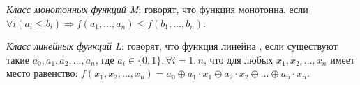 \textit{Класс монотонных функций M}: говорят, что функция монотонна, если $\forall i (a_{i} \leqslant b_{i}) \Rightarrow f(a_{1}, \ldots ,a_{n})\leqslant f(b_{1}, \ldots ,b_{n})$.

\textit{Класс линейных функций L}: говорят, что функция линейна , если существуют такие $a_{0}, a_{1}, a_{2}, \ldots, a_{n}$, где $a_{i} \in \{0, 1\}, \forall i=\overline{1,n}$, что для любых $x_{1}, x_{2}, \ldots, x_{n}$ имеет место равенство:
$f(x_{1}, x_{2}, \ldots, x_{n}) = a_{0} \oplus a_{1} \cdot x_{1} \oplus a_{2} \cdot x_{2} \oplus \ldots \oplus a_{n} \cdot x_{n}$.